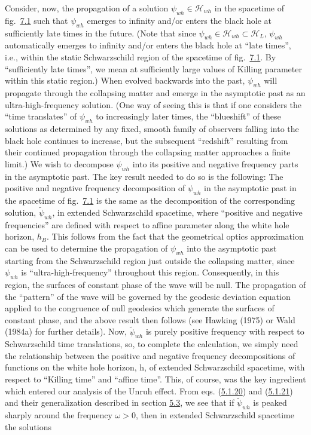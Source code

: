 \documentclass[11pt,a4paper]{article}
\begin{document}
Consider, now, the propagation of a solution \(\psi_{wh} \in \mathcal{H}_{wh}\) in the spacetime of fig.~\hyperref[fig:7.1]{7.1} such that \(\psi_{wh}\) emerges to infinity and/or enters the black hole at sufficiently late times in the future. (Note that since \(\psi_{wh} \in \mathcal{H}_{wh} \subset \mathcal{H}_{L}\), \(\psi_{wh}\) automatically emerges to infinity and/or enters the black hole at ``late times'', i.e., within the static Schwarzschild region of the spacetime of fig.~\hyperref[fig:7.1]{7.1}. By ``sufficiently late times'', we mean at sufficiently large values of Killing parameter within this static region.) When evolved backwards into the past, \(\psi_{wh}\) will propagate through the collapsing matter and emerge in the asymptotic past as an ultra-high-frequency solution. (One way of seeing this is that if one considers the ``time translates'' of \(\psi_{wh}\) to increasingly later times, the ``blueshift'' of these solutions as determined by any fixed, smooth family of observers falling into the black hole continues to increase, but the subsequent ``redshift'' resulting\hypertarget{source-169}{} from their continued propagation through the collapsing matter approaches a finite limit.) We wish to decompose \(\psi_{wh}\) into its positive and negative frequency parts in the asymptotic past. The key result needed to do so is the following: The positive and negative frequency decomposition of \(\psi_{wh}\) in the asymptotic past in the spacetime of fig.~\hyperref[fig:7.1]{7.1} is the same as the decomposition of the corresponding solution, \(\tilde{\psi}_{wh}\), in extended Schwarzschild spacetime, where ``positive and negative frequencies'' are defined with respect to affine parameter along the white hole horizon, \(h_B\). This follows from the fact that the geometrical optics approximation can be used to determine the propagation of \(\psi_{wh}\) into the asymptotic past starting from the Schwarzschild region just outside the collapsing matter, since \(\psi_{wh}\) is ``ultra-high-frequency'' throughout this region. Consequently, in this region, the surfaces of constant phase of the wave will be null. The propagation of the ``pattern'' of the wave will be governed by the geodesic deviation equation applied to the congruence of null geodesics which generate the surfaces of constant phase, and the above result then follows (see Hawking (1975) or Wald (1984a) for further details). Now, \(\widetilde{\psi}_{wh}\) is purely positive frequency with respect to Schwarzschild time translations, so, to complete the calculation, we simply need the relationship between the positive and negative frequency decompositions of functions on the white hole horizon, h, of extended Schwarzschild spacetime, with respect to ``Killing time'' and ``affine time''. This, of course, was the key ingredient which entered our analysis of the Unruh effect. From eqs. (\hyperref[eq:5.1.20]{5.1.20}) and (\hyperref[eq:5.1.21]{5.1.21}) and their generalization described in section \hyperlink{sec:5.3}{5.3}, we see that if \(\tilde{\psi}_{wh}\) is peaked sharply around the frequency \(\omega > 0\), then in extended Schwarzschild spacetime the solutions
\end{document}
